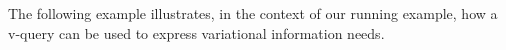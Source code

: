 %
%
%






The following example illustrates, in the context of our running example, how
a v-query can be used to express variational information needs.

